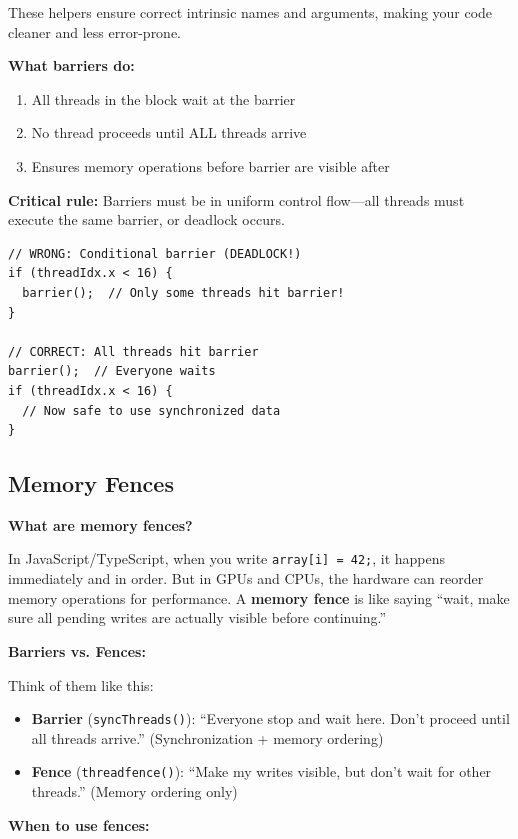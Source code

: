 \documentclass[11pt]{article}
\begin{document}
These helpers ensure correct intrinsic names and arguments, making your code cleaner and less error-prone.

\textbf{What barriers do:}
\begin{enumerate}[noitemsep]
  \item All threads in the block wait at the barrier
  \item No thread proceeds until ALL threads arrive
  \item Ensures memory operations before barrier are visible after
\end{enumerate}

\textbf{Critical rule:} Barriers must be in uniform control flow—all threads must execute the same barrier, or deadlock occurs.

\begin{lstlisting}[style=ts]
// WRONG: Conditional barrier (DEADLOCK!)
if (threadIdx.x < 16) {
  barrier();  // Only some threads hit barrier!
}

// CORRECT: All threads hit barrier
barrier();  // Everyone waits
if (threadIdx.x < 16) {
  // Now safe to use synchronized data
}
\end{lstlisting}

\subsection{Memory Fences}

\textbf{What are memory fences?}

In JavaScript/TypeScript, when you write \texttt{array[i] = 42;}, it happens immediately and in order. But in GPUs and CPUs, the hardware can reorder memory operations for performance. A \textbf{memory fence} is like saying ``wait, make sure all pending writes are actually visible before continuing.''

\textbf{Barriers vs. Fences:}

Think of them like this:
\begin{itemize}[noitemsep]
  \item \textbf{Barrier} (\texttt{syncThreads()}): ``Everyone stop and wait here. Don't proceed until all threads arrive.'' (Synchronization + memory ordering)
  \item \textbf{Fence} (\texttt{threadfence()}): ``Make my writes visible, but don't wait for other threads.'' (Memory ordering only)
\end{itemize}

\textbf{When to use fences:}
\end{document}

